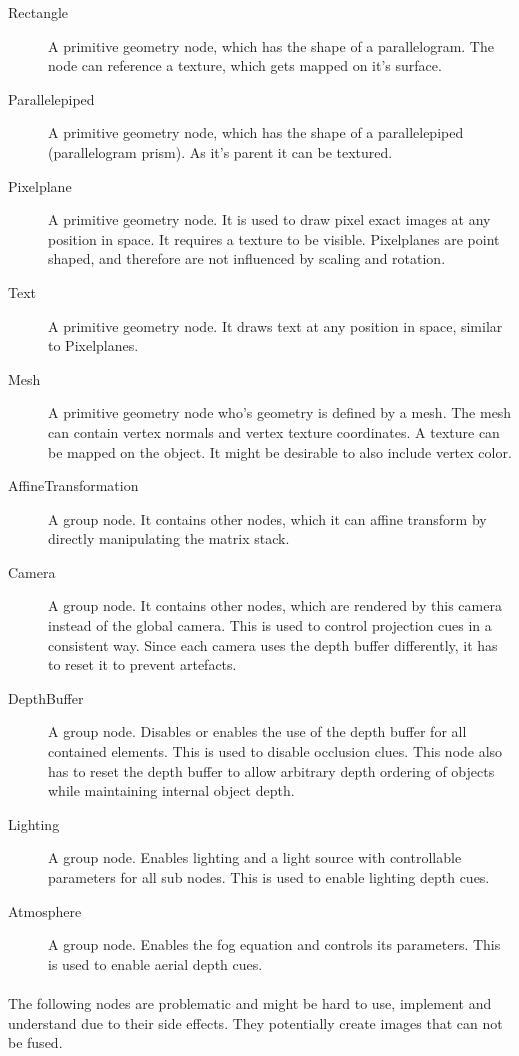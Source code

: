 \begin{description}
\item[Rectangle] A primitive geometry node, which has the shape of a parallelogram. The node can reference a texture, which gets mapped on it's surface.
\item[Parallelepiped] A primitive geometry node, which has the shape of a parallelepiped (parallelogram prism). As it's parent it can be textured.
\item[Pixelplane] A primitive geometry node. It is used to draw pixel exact images at any position in space. It requires a texture to be visible. Pixelplanes are point shaped, and therefore are not influenced by scaling and rotation.
\item[Text] A primitive geometry node. It draws text at any position in space, similar to Pixelplanes.
\item[Mesh] A primitive geometry node who's geometry is defined by a mesh. The mesh can contain vertex normals and vertex texture coordinates. A texture can be mapped on the object. It might be desirable to also include vertex color.
\item[AffineTransformation] A group  node. It contains other nodes, which it can affine transform by directly manipulating the matrix stack.
\item[Camera] A group node. It contains other nodes, which are rendered by this camera instead of the global camera. This is used to control projection cues in a consistent way.
Since each camera uses the depth buffer differently, it has to reset it to prevent artefacts.
\item[DepthBuffer] A group node. Disables or enables the use of the depth buffer for all contained elements. This is used to disable occlusion clues.
This node also has to reset the depth buffer to allow arbitrary depth ordering of objects while maintaining internal object depth.
\item[Lighting] A group node. Enables lighting and a light source with controllable parameters for all sub nodes. This is used to enable lighting depth cues.
\item[Atmosphere] A group node. Enables the fog equation and controls its parameters. This is used to enable aerial depth cues.
\end{description}

\paragraph{}
The following nodes are problematic and might be hard to use, implement and understand due to their side effects.
They potentially create images that can not be fused.

